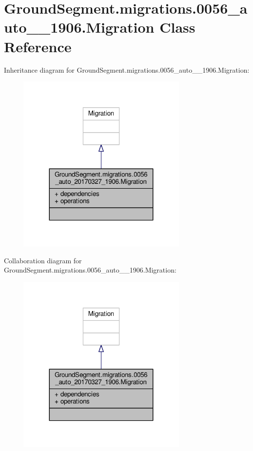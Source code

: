 \hypertarget{class_ground_segment_1_1migrations_1_10056__auto__20170327__1906_1_1_migration}{}\section{Ground\+Segment.\+migrations.0056\+\_\+auto\+\_\+\_\+1906.Migration Class Reference}
\label{class_ground_segment_1_1migrations_1_10056__auto__20170327__1906_1_1_migration}


Inheritance diagram for Ground\+Segment.\+migrations.0056\+\_\+auto\+\_\+\_\+1906.Migration\+:\nopagebreak
\begin{figure}[H]
\begin{center}
\leavevmode
\includegraphics[width=239pt]{class_ground_segment_1_1migrations_1_10056__auto__20170327__1906_1_1_migration__inherit__graph}
\end{center}
\end{figure}


Collaboration diagram for Ground\+Segment.\+migrations.0056\+\_\+auto\+\_\+\_\+1906.Migration\+:\nopagebreak
\begin{figure}[H]
\begin{center}
\leavevmode
\includegraphics[width=239pt]{class_ground_segment_1_1migrations_1_10056__auto__20170327__1906_1_1_migration__coll__graph}
\end{center}
\end{figure}
